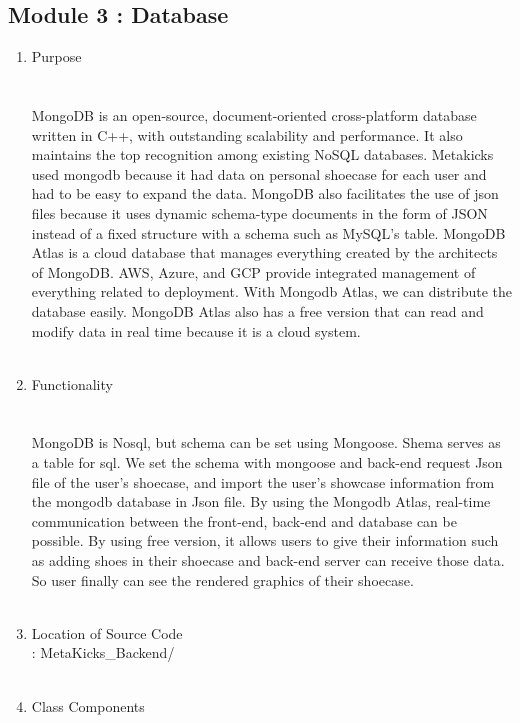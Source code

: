 \documentclass[conference]{IEEEtran}
\begin{document}
\subsection{Module 3 : Database}
\begin{enumerate}
\item Purpose\\
\\\\MongoDB is an open-source, document-oriented cross-platform database written in C++, with outstanding scalability and performance. It also maintains the top recognition among existing NoSQL databases. Metakicks used mongodb because it had data on personal shoecase for each user and had to be easy to expand the data. MongoDB also facilitates the use of json files because it uses dynamic schema-type documents in the form of JSON instead of a fixed structure with a schema such as MySQL's table. MongoDB Atlas is a cloud database that manages everything created by the architects of MongoDB. AWS, Azure, and GCP provide integrated management of everything related to deployment. With Mongodb Atlas, we can distribute the database easily. MongoDB Atlas also has a free version that can read and modify data in real time because it is a cloud system.\\\\
\item Functionality\\
\\\\MongoDB is Nosql, but schema can be set using Mongoose. Shema serves as a table for sql. We set the schema with mongoose and back-end request Json file of the user's shoecase, and import the user's showcase information from the mongodb database in Json file. By using the Mongodb Atlas, real-time communication between the front-end, back-end and database can be possible. By using free version, it allows users to give their information such as adding shoes in their shoecase and back-end server can receive those data. So user finally can see the rendered graphics of their shoecase. \\\\
\item Location of Source Code\\
: MetaKicks\_Backend/\\\\
\item Class Components\\
	\begin{enumerate}

\end{enumerate}
\end{enumerate}
\end{document}
